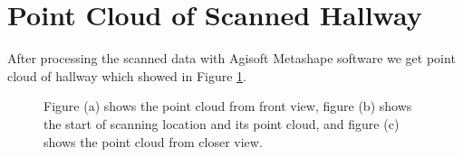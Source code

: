 \section{Point Cloud of Scanned Hallway}
After processing the scanned data with Agisoft Metashape software we get point cloud of hallway which showed in Figure \ref{fig:Hallway pointcloud}.

\begin{figure}[H]
  \centering
  \hfill
  \hfill
  
  \caption[Hallway point cloud from closer view]{Figure (a) shows the point cloud from front view, figure (b) shows the start of scanning location and its point cloud, and figure (c) shows the point cloud from closer view.}
\label{fig:Hallway pointcloud}
\end{figure}

